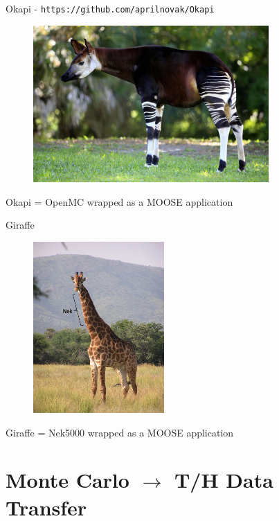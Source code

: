 \documentclass[10pt]{beamer}
\begin{document}
\begin{frame}{Okapi - {\tt https://github.com/aprilnovak/Okapi}}

\begin{figure}
\includegraphics[width=9cm]{../Figures/okapi_animal.jpg}
\end{figure}

\centering
Okapi = OpenMC wrapped as a MOOSE application
\end{frame}

\begin{frame}{Giraffe}

\begin{figure}
\includegraphics[width=5cm]{../Figures/giraffe_nek.png}
\end{figure}

\centering
Giraffe = Nek5000 wrapped as a MOOSE application
\end{frame}

\section{Monte Carlo \(\rightarrow\) T/H Data Transfer}
\end{document}
